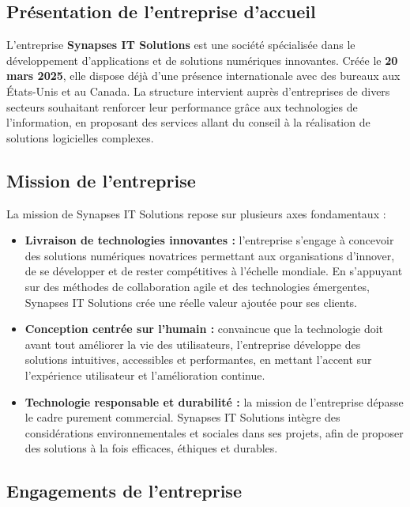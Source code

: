 \documentclass[12pt,a4paper]{report}
\newcommand{\motcle}[1]{\textcolor{marine}{\textbf{#1}}}
\begin{document}
\subsection{Présentation de l'entreprise d'accueil}

L'entreprise \motcle{Synapses IT Solutions} est une société spécialisée dans le développement d'applications et de solutions numériques innovantes. Créée le \textbf{20 mars 2025}, elle dispose déjà d'une présence internationale avec des bureaux aux États-Unis et au Canada. La structure intervient auprès d'entreprises de divers secteurs souhaitant renforcer leur performance grâce aux technologies de l'information, en proposant des services allant du conseil à la réalisation de solutions logicielles complexes.


\subsection{Mission de l'entreprise}

La mission de Synapses IT Solutions repose sur plusieurs axes fondamentaux :

\begin{itemize}
    \item \textbf{Livraison de technologies innovantes :} l'entreprise s'engage à concevoir des solutions numériques novatrices permettant aux organisations d'innover, de se développer et de rester compétitives à l'échelle mondiale. En s'appuyant sur des méthodes de collaboration agile et des technologies émergentes, Synapses IT Solutions crée une réelle valeur ajoutée pour ses clients.

    \item \textbf{Conception centrée sur l'humain :} convaincue que la technologie doit avant tout améliorer la vie des utilisateurs, l'entreprise développe des solutions intuitives, accessibles et performantes, en mettant l'accent sur l'expérience utilisateur et l'amélioration continue.

    \item \textbf{Technologie responsable et durabilité :} la mission de l'entreprise dépasse le cadre purement commercial. Synapses IT Solutions intègre des considérations environnementales et sociales dans ses projets, afin de proposer des solutions à la fois efficaces, éthiques et durables.
\end{itemize}

\subsection{Engagements de l'entreprise}
\end{document}
